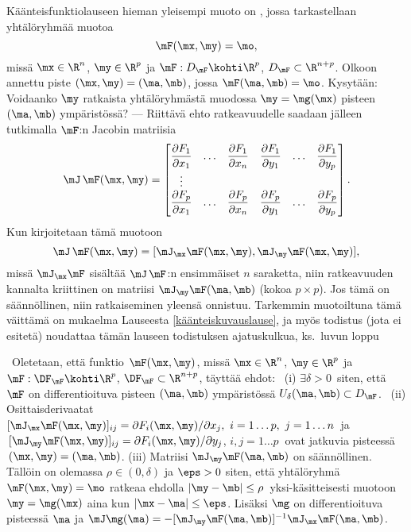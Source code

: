 Käänteisfunktiolauseen hieman yleisempi muoto on , jossa 
tarkastellaan yhtälöryhmää muotoa
\[
\mF(\mx,\my)=\mo,
\]
missä $\mx\in\R^n$, $\my\in\R^p$ ja $\mF:D_\mF\kohti\R^p$, $D_\mF\subset\R^{n+p}$. Olkoon 
annettu piste $(\mx,\my)=(\ma,\mb)$, jossa $\mF(\ma,\mb)=\mo$. Kysytään: Voidaanko $\my$ 
ratkaista yhtälöryhmästä muodossa $\my=\mg(\mx)$ pisteen $(\ma,\mb)$ ympäristössä? 
--- Riittävä ehto ratkeavuudelle saadaan jälleen tutkimalla $\mF$:n Jacobin matriisia
\[
\mJ\,\mF(\mx,\my)=\begin{bmatrix}
\dfrac{\partial F_1}{\partial x_1} & \ldots & \dfrac{\partial F_1}{\partial x_n} & 
\dfrac{\partial F_1}{\partial y_1} & \ldots & \dfrac{\partial F_1}{\partial y_p} \\ \vdots \\
\dfrac{\partial F_p}{\partial x_1} & \ldots & \dfrac{\partial F_p}{\partial x_n} & 
\dfrac{\partial F_p}{\partial y_1} & \ldots & \dfrac{\partial F_p}{\partial y_p}
\end{bmatrix}.
\]
Kun kirjoitetaan tämä muotoon 
\[
\mJ\,\mF(\mx,\my)=[\mJ_\mx\mF(\mx,\my), \mJ_\my\mF(\mx,\my)],
\]
missä $\mJ_\mx\mF$ sisältää $\mJ\,\mF$:n ensimmäiset $n$ saraketta, niin ratkeavuuden kannalta
kriittinen on matriisi $\mJ_\my\mF(\ma,\mb)$ (kokoa $p \times p$). Jos tämä on säännöllinen,
niin ratkaiseminen yleensä onnistuu. Tarkemmin muotoiltuna tämä väittämä on mukaelma Lauseesta
\ref{käänteiskuvauslause}, ja myös todistus (jota ei esitetä) noudattaa tämän lauseen
todistuksen ajatuskulkua, ks.\ luvun loppu 
\begin{*Lause} \label{implisiittifunktiolause}  
 \ Oletetaan, että funktio $\,\mF(\mx,\my)$, \linebreak 
missä $\mx\in\R^n$, $\my\in\R^p$ ja $\mF:\DF_\mF\kohti\R^p$, $\DF_\mF\subset\R^{n+p}$, täyttää
ehdot: \ (i) $\exists\delta>0\,$ siten, että $\mF$ on differentioituva pisteen $(\ma,\mb)$
ympäristössä $U_\delta(\ma,\mb) \subset D_\mF$. \ \linebreak (ii) Osittaisderivaatat
$[\mJ_\mx\mF(\mx,\my)]_{ij}=\partial F_i(\mx,\my)/\partial x_j,\ i=1 \ldots p,\ j=1 \ldots n\,$
ja $\,[\mJ_\my\mF(\mx,\my)]_{ij}=\partial F_i(\mx,\my)/\partial y_j$, $i,j=1 \ldots p\ $ ovat
jatkuvia pisteessä $\,(\mx,\my)=(\ma,\mb)$. (iii) Matriisi $\mJ_\my\mF(\ma,\mb)$ on
säännöllinen. Tällöin on olemassa $\rho\in(0,\delta)$ ja $\eps>0$ siten, että yhtälöryhmä
$\mF(\mx,\my)=\mo$ ratkeaa ehdolla $|\my-\mb|\le\rho\,$ yksi-käsitteisesti muotoon
$\my=\mg(\mx)$ aina kun $|\mx-\ma|\le\eps$. Lisäksi $\mg$ on differentioituva pisteessä $\ma$
ja $\mJ\mg(\ma) = -[\mJ_\my\mF(\ma,\mb)]^{-1}\mJ_\mx\mF(\ma,\mb)$.
\end{*Lause}
